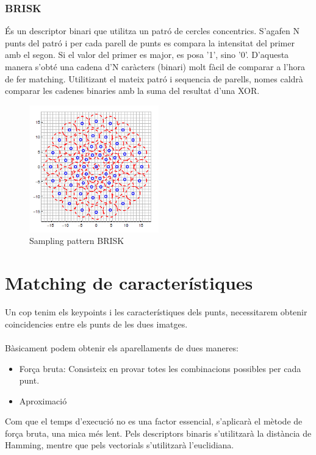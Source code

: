 	\subsubsection{BRISK}
	És un descriptor binari que utilitza un patró de cercles concentrics. S'agafen N punts del patró i per cada parell de punts es compara la intensitat del primer amb el segon. Si el valor del primer es
	major, es posa '1', sino '0'. D'aquesta manera s'obté una cadena d'N caràcters (binari) molt fàcil de comparar a l'hora de fer matching. Utilitizant el mateix patró i sequencia de parells, nomes caldrà
	comparar les cadenes binaries amb la suma del resultat d'una XOR.
	\begin{figure}[H]
		\centering
		\includegraphics[width=0.5\textwidth]{images/brisk}
		\caption{Sampling pattern BRISK}
	\end{figure}


\newpage
\section{Matching de característiques}

	Un cop tenim els keypoints i les característiques dels punts, necessitarem obtenir coincidencies entre els punts de les dues imatges.\\\\
	Bàsicament podem obtenir els aparellaments de dues maneres:\\
	\begin{itemize}	
		\item{Força bruta: Consisteix en provar totes les combinacions possibles per cada punt.}
		\item{Aproximació\\}
	\end{itemize}
	Com que el temps d'execució no es una factor essencial, s'aplicarà el mètode de força bruta, una mica més lent. Pels descriptors binaris s'utilitzarà la distància de Hamming, mentre que pels vectorials
	s'utilitzarà l'euclidiana.\\

